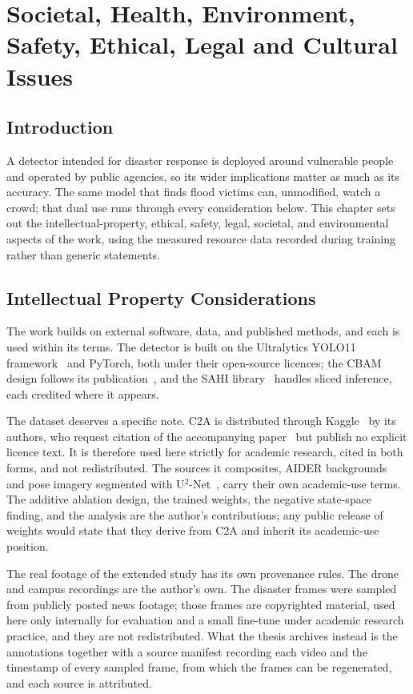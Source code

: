 \chapter{Societal, Health, Environment, Safety, Ethical, Legal and Cultural Issues}

\section{Introduction}
A detector intended for disaster response is deployed around vulnerable people
and operated by public agencies, so its wider implications matter as much as
its accuracy. The same model that finds flood victims can, unmodified, watch a
crowd; that dual use runs through every consideration below. This chapter sets
out the intellectual-property, ethical, safety, legal, societal, and
environmental aspects of the work, using the measured resource data recorded
during training rather than generic statements.

\section{Intellectual Property Considerations}
The work builds on external software, data, and published methods, and each is
used within its terms. The detector is built on the Ultralytics YOLO11
framework~\cite{jocher2024yolo11} and PyTorch, both under their open-source
licences; the CBAM design follows its publication~\cite{woo2018cbam}, and the
SAHI library~\cite{akyon2022sahi} handles sliced inference, each credited
where it appears.

The dataset deserves a specific note. C2A is distributed through
Kaggle~\cite{c2akaggle} by its authors, who request citation of the
accompanying paper~\cite{nihal2024c2a} but publish no explicit licence text.
It is therefore used here strictly for academic research, cited in both
forms, and not redistributed. The sources it composites, AIDER
backgrounds~\cite{kyrkou2020aider} and pose imagery segmented with
U$^2$-Net~\cite{qin2020u2net}, carry their own academic-use terms. The
additive ablation design, the trained weights, the negative state-space
finding, and the analysis are the author's contributions; any public release
of weights would state that they derive from C2A and inherit its
academic-use position.

The real footage of the extended study has its own provenance rules. The
drone and campus recordings are the author's own. The disaster frames were
sampled from publicly posted news footage; those frames are copyrighted
material, used here only internally for evaluation and a small fine-tune
under academic research practice, and they are not redistributed. What the
thesis archives instead is the annotations together with a source manifest
recording each video and the timestamp of every sampled frame, from which
the frames can be regenerated, and each source is attributed.

